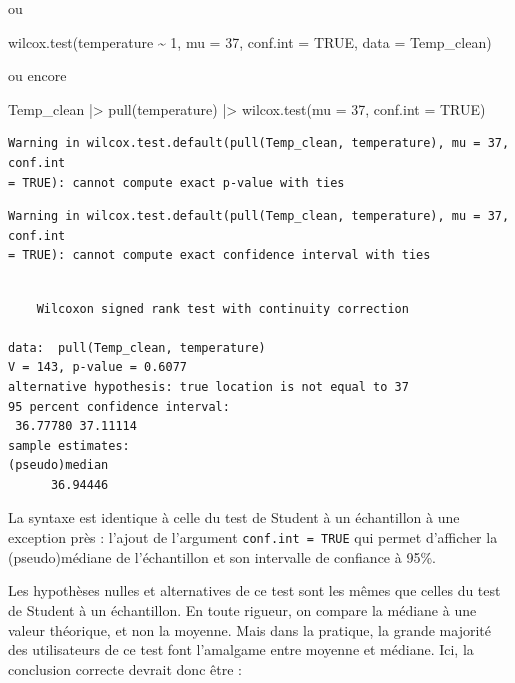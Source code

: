 \documentclass[
  french,
  a4paper,
  DIV=11,
  numbers=noendperiod,
  oneside]{scrreprt}
\newenvironment{Shaded}{}{}
\newcommand{\AttributeTok}[1]{\textcolor[rgb]{0.84,0.23,0.29}{#1}}
\newcommand{\ConstantTok}[1]{\textcolor[rgb]{0.00,0.36,0.77}{#1}}
\newcommand{\DecValTok}[1]{\textcolor[rgb]{0.00,0.36,0.77}{#1}}
\newcommand{\FunctionTok}[1]{\textcolor[rgb]{0.44,0.26,0.76}{#1}}
\newcommand{\NormalTok}[1]{\textcolor[rgb]{0.14,0.16,0.18}{#1}}
\newcommand{\SpecialCharTok}[1]{\textcolor[rgb]{0.00,0.36,0.77}{#1}}
\begin{document}
ou

\begin{Shaded}
\begin{Highlighting}[]
\FunctionTok{wilcox.test}\NormalTok{(temperature }\SpecialCharTok{\textasciitilde{}} \DecValTok{1}\NormalTok{, }\AttributeTok{mu =} \DecValTok{37}\NormalTok{, }\AttributeTok{conf.int =} \ConstantTok{TRUE}\NormalTok{, }\AttributeTok{data =}\NormalTok{ Temp\_clean)}
\end{Highlighting}
\end{Shaded}

ou encore

\begin{Shaded}
\begin{Highlighting}[]
\NormalTok{Temp\_clean }\SpecialCharTok{|\textgreater{}}
  \FunctionTok{pull}\NormalTok{(temperature) }\SpecialCharTok{|\textgreater{}}
  \FunctionTok{wilcox.test}\NormalTok{(}\AttributeTok{mu =} \DecValTok{37}\NormalTok{, }\AttributeTok{conf.int =} \ConstantTok{TRUE}\NormalTok{)}
\end{Highlighting}
\end{Shaded}

\begin{verbatim}
Warning in wilcox.test.default(pull(Temp_clean, temperature), mu = 37, conf.int
= TRUE): cannot compute exact p-value with ties
\end{verbatim}

\begin{verbatim}
Warning in wilcox.test.default(pull(Temp_clean, temperature), mu = 37, conf.int
= TRUE): cannot compute exact confidence interval with ties
\end{verbatim}

\begin{verbatim}

    Wilcoxon signed rank test with continuity correction

data:  pull(Temp_clean, temperature)
V = 143, p-value = 0.6077
alternative hypothesis: true location is not equal to 37
95 percent confidence interval:
 36.77780 37.11114
sample estimates:
(pseudo)median 
      36.94446 
\end{verbatim}

La syntaxe est identique à celle du test de Student à un échantillon à
une exception près : l'ajout de l'argument \texttt{conf.int\ =\ TRUE}
qui permet d'afficher la (pseudo)médiane de l'échantillon et son
intervalle de confiance à 95\%.

Les hypothèses nulles et alternatives de ce test sont les mêmes que
celles du test de Student à un échantillon. En toute rigueur, on compare
la médiane à une valeur théorique, et non la moyenne. Mais dans la
pratique, la grande majorité des utilisateurs de ce test font l'amalgame
entre moyenne et médiane. Ici, la conclusion correcte devrait donc être
:
\end{document}
